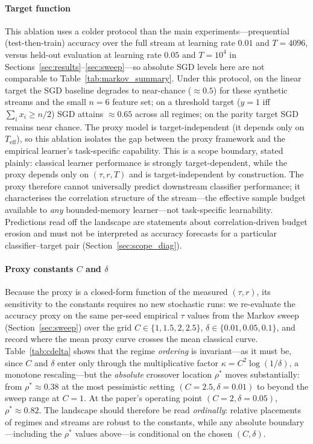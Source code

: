 \documentclass[sensors,article,submit,pdftex,moreauthors]{Definitions/mdpi}
\newcommand{\Teff}{T_{\mathrm{eff}}}
\begin{document}
\paragraph{Target function} This ablation uses a colder protocol than the main experiments---prequential (test-then-train) accuracy over the full stream at learning rate $0.01$ and $T = 4096$, versus held-out evaluation at learning rate $0.05$ and $T = 10^{4}$ in Sections~\ref{sec:results}--\ref{sec:sweep}---so absolute SGD levels here are not comparable to Table~\ref{tab:markov_summary}. Under this protocol, on the linear target the SGD baseline degrades to near-chance ($\approx 0.5$) for these synthetic streams and the small $n=6$ feature set; on a threshold target ($y = 1$ iff $\sum_i x_i \geq n/2$) SGD attains $\approx 0.65$ across all regimes; on the parity target SGD remains near chance. The proxy model is target-independent (it depends only on $\Teff$), so this ablation isolates the gap between the proxy framework and the empirical learner's task-specific capability. This is a scope boundary, stated plainly: classical learner performance is strongly target-dependent, while the proxy depends only on $(\tau, r, T)$ and is target-independent by construction. The proxy therefore cannot universally predict downstream classifier performance; it characterises the correlation structure of the stream---the effective sample budget available to \emph{any} bounded-memory learner---not task-specific learnability. Predictions read off the landscape are statements about correlation-driven budget erosion and must not be interpreted as accuracy forecasts for a particular classifier--target pair (Section~\ref{sec:scope_diag}).

\paragraph{Proxy constants $C$ and $\delta$} Because the proxy is a closed-form function of the measured $(\tau, r)$, its sensitivity to the constants requires no new stochastic runs: we re-evaluate the accuracy proxy on the same per-seed empirical $\tau$ values from the Markov sweep (Section~\ref{sec:sweep}) over the grid $C \in \{1, 1.5, 2, 2.5\}$, $\delta \in \{0.01, 0.05, 0.1\}$, and record where the mean proxy curve crosses the mean classical curve. Table~\ref{tab:cdelta} shows that the regime \emph{ordering} is invariant---as it must be, since $C$ and $\delta$ enter only through the multiplicative factor $\kappa = C^{2}\log(1/\delta)$, a monotone rescaling---but the \emph{absolute} crossover location $\rho^{*}$ moves substantially: from $\rho^{*} \approx 0.38$ at the most pessimistic setting $(C{=}2.5, \delta{=}0.01)$ to beyond the sweep range at $C = 1$. At the paper's operating point $(C{=}2, \delta{=}0.05)$, $\rho^{*} \approx 0.82$. The landscape should therefore be read \emph{ordinally}: relative placements of regimes and streams are robust to the constants, while any absolute boundary---including the $\rho^{*}$ values above---is conditional on the chosen $(C, \delta)$.
\end{document}
